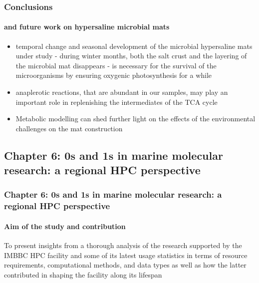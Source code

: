 \documentclass{beamer}
\begin{document}
   \begin{frame}
      \frametitle{Conclusions}
      \framesubtitle{and future work on hypersaline microbial mats}

      \begin{itemize}
         \item temporal change and seasonal development of the microbial hypersaline mats under study - during winter months,
         both the salt crust and the layering of the microbial mat disappears - is necessary for the survival of the microorganisms
         by ensuring oxygenic photosynthesis for a while 
         \item anaplerotic reactions, that are abundant in our samples, may play an important role in replenishing the intermediates of the TCA cycle
         \item Metabolic modelling can shed further light on the effects of the environmental challenges on the mat construction 
      \end{itemize}


   \end{frame}


   \begin{darkframes}
      \section{\textbf{Chapter 6:} 0s and 1s in marine molecular
      research: a regional HPC perspective}

      \begin{frame}
         \frametitle{\textbf{Chapter 6:} 0s and 1s in marine molecular research: a regional HPC perspective}
         \framesubtitle{Aim of the study and contribution}

         To present insights from a thorough analysis of the research supported by
         the IMBBC HPC facility and some of its latest usage statistics in terms of resource requirements, 
         computational methods, and data types as well as how the latter contributed in shaping the facility
         along its lifespan
         
      \end{frame}

   \end{darkframes}
\end{document}
